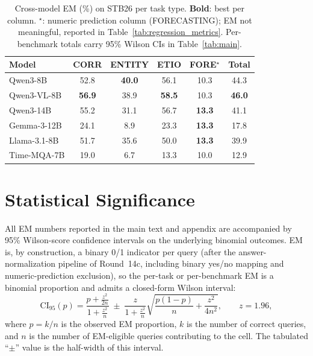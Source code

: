 \begin{table}[!htbp]
\centering
\caption{Cross-model EM (\%) on STB26 per task type.  \textbf{Bold}: best per column.  $^\star$: numeric prediction column (FORECASTING); EM not meaningful, reported in Table~\ref{tab:regression_metrics}.  Per-benchmark totals carry 95\% Wilson CIs in Table~\ref{tab:main}.}
\label{tab:cross_stbenchnew}
\small
\begin{tabular}{lcccc|c}
\toprule
Model & CORR & ENTITY & ETIO & FORE$^\star$ & Total \\
\midrule
Qwen3-8B       & 52.8          & \textbf{40.0} & 56.1          & 10.3          & 44.3 \\
Qwen3-VL-8B    & \textbf{56.9} & 38.9          & \textbf{58.5} & 10.3          & \textbf{46.0} \\
Qwen3-14B      & 55.2          & 31.1          & 56.7          & \textbf{13.3} & 41.1 \\
Gemma-3-12B    & 24.1          & 8.9           & 23.3          & \textbf{13.3} & 17.8 \\
Llama-3.1-8B   & 51.7          & 35.6          & 50.0          & \textbf{13.3} & 39.9 \\
Time-MQA-7B    & 19.0          & 6.7           & 13.3          & 10.0          & 12.9 \\
\bottomrule
\end{tabular}
\end{table}


\FloatBarrier
\section{Statistical Significance}
\label{app:stat_sig}

All EM numbers reported in the main text and appendix are accompanied by 95\% Wilson-score confidence intervals on the underlying binomial outcomes.  EM is, by construction, a binary 0/1 indicator per query (after the answer-normalization pipeline of Round~14c, including binary yes/no mapping and numeric-prediction exclusion), so the per-task or per-benchmark EM is a binomial proportion and admits a closed-form Wilson interval:
\[
\text{CI}_{95}(p) =
\frac{p + \tfrac{z^{2}}{2n}}{1 + \tfrac{z^{2}}{n}}
\;\pm\;
\frac{z}{1 + \tfrac{z^{2}}{n}} \sqrt{\frac{p(1-p)}{n} + \frac{z^{2}}{4 n^{2}}},
\qquad
z = 1.96,
\]
where $p = k/n$ is the observed EM proportion, $k$ is the number of correct queries, and $n$ is the number of EM-eligible queries contributing to the cell.  The tabulated ``$\pm$'' value is the half-width of this interval.

